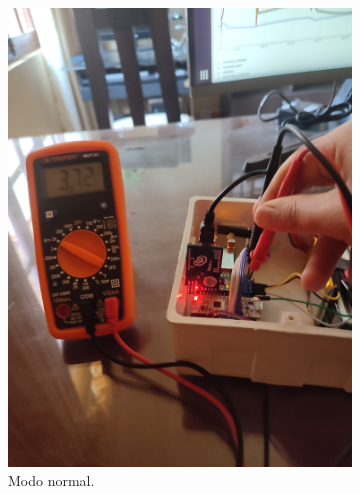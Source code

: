 \begin{figure}[h!]
  \centering
  \begin{subfigure}[b]{0.28\linewidth}
  \includegraphics[width=\linewidth]{./Figures/voltaje3v.jpg}
  \caption{Modo normal.}
  \label{fig:Consumo normal}
  \end{subfigure}
  \begin{subfigure}[b]{0.28\linewidth}

\end{subfigure}
\end{figure}
